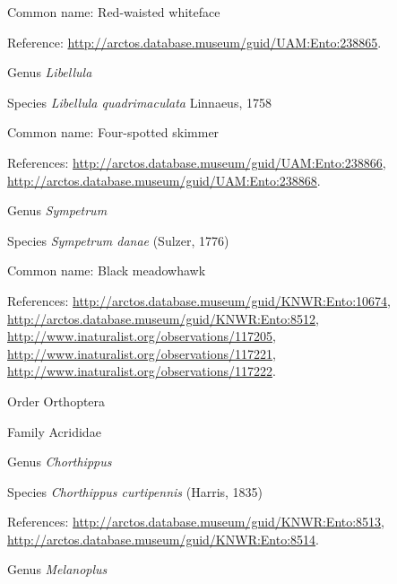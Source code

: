 \documentclass[9pt, article]{memoir}
\begin{document}
\begin{multicols}{2}
Common name: Red-waisted whiteface

Reference: 
\url{http://arctos.database.museum/guid/UAM:Ento:238865}.

\vspace{6pt}\noindent\hspace{30pt}Genus \textit{Libellula}


\vspace{6pt}\noindent\hspace{36pt}Species \textit{Libellula quadrimaculata} Linnaeus, 1758


Common name: Four-spotted skimmer

References: 
\url{http://arctos.database.museum/guid/UAM:Ento:238866}, 
\url{http://arctos.database.museum/guid/UAM:Ento:238868}.

\vspace{6pt}\noindent\hspace{30pt}Genus \textit{Sympetrum}


\vspace{6pt}\noindent\hspace{36pt}Species \textit{Sympetrum danae} (Sulzer, 1776)


Common name: Black meadowhawk

References: 
\url{http://arctos.database.museum/guid/KNWR:Ento:10674}, 
\url{http://arctos.database.museum/guid/KNWR:Ento:8512}, 
\url{http://www.inaturalist.org/observations/117205}, 
\url{http://www.inaturalist.org/observations/117221}, 
\url{http://www.inaturalist.org/observations/117222}.

\vspace{6pt}\noindent\hspace{18pt}Order Orthoptera


\vspace{6pt}\noindent\hspace{24pt}Family Acrididae


\vspace{6pt}\noindent\hspace{30pt}Genus \textit{Chorthippus}


\vspace{6pt}\noindent\hspace{36pt}Species \textit{Chorthippus curtipennis} (Harris, 1835)


References: 
\url{http://arctos.database.museum/guid/KNWR:Ento:8513}, 
\url{http://arctos.database.museum/guid/KNWR:Ento:8514}.

\vspace{6pt}\noindent\hspace{30pt}Genus \textit{Melanoplus}



\end{multicols}
\end{document}
